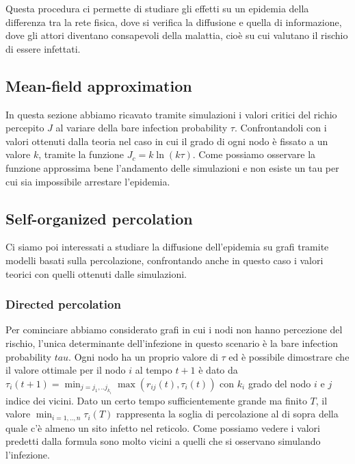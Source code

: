 Questa procedura ci permette di studiare gli effetti su un epidemia della differenza tra la rete fisica, dove si verifica la
diffusione e quella di informazione, dove gli attori diventano consapevoli della malattia,
cioè su cui valutano il rischio di essere infettati.

\subsection{Mean-field approximation}\label{subsec:mean-field-approximation}
In questa sezione abbiamo ricavato tramite simulazioni i valori critici del richio percepito $J$
al variare della bare infection probability $\tau$. Confrontandoli con i valori ottenuti dalla teoria nel caso
in cui il grado di ogni nodo è fissato a  un valore $k$, tramite la funzione $J_{c}=k\ln(k\tau)$.
Come possiamo osservare la funzione approssima bene l'andamento delle simulazioni e non esiste un tau per cui 
sia impossibile arrestare l'epidemia. 
\subsection{Self-organized percolation}\label{subsec:self-organized-percolation}
Ci siamo poi interessati a studiare la diffusione dell'epidemia su grafi tramite modelli basati 
sulla percolazione, confrontando anche in questo caso i valori teorici con quelli ottenuti dalle simulazioni.

\subsubsection{Directed percolation}\label{subsubsec:directed-percolation}
Per cominciare abbiamo considerato grafi in cui i nodi non hanno percezione del rischio, l'unica determinante 
dell'infezione in questo scenario è la bare infection probability $tau$. Ogni nodo ha un proprio valore di $\tau$
ed è possibile dimostrare che il valore ottimale per il nodo $i$ al tempo $t+1$ è dato da $\tau_{i}(t+1) = \min_{j= j_{1},..j_{k_{i}}}\max(r_{ij}(t), \tau_{i}(t))$
con $k_{i}$ grado del nodo $i$ e $j$ indice dei vicini.
Dato un certo tempo sufficientemente grande ma finito $T$, il valore  $\min_{i=1,..,n}\tau_{i}(T)$ 
rappresenta la soglia di percolazione al di sopra della quale c'è almeno un sito infetto nel reticolo.
Come possiamo vedere i valori predetti dalla formula sono molto vicini a quelli che si osservano simulando 
l'infezione.
